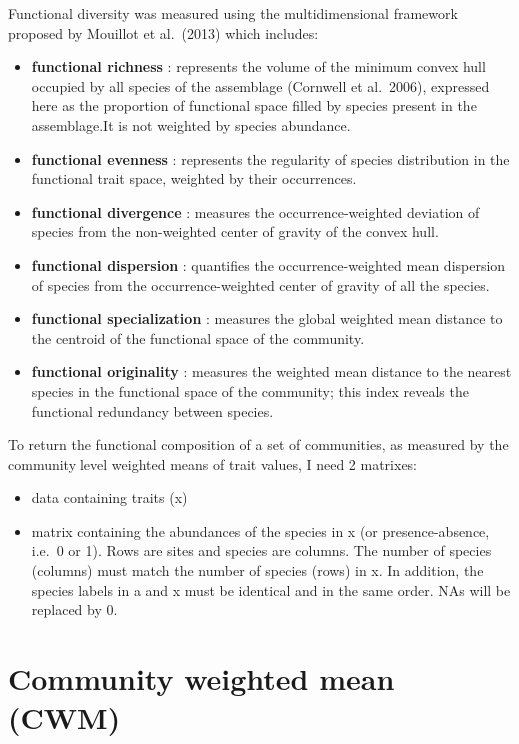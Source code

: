 \documentclass[
]{book}
\providecommand{\tightlist}{%
  \setlength{\itemsep}{0pt}\setlength{\parskip}{0pt}}
\begin{document}
Functional diversity was measured using the multidimensional framework proposed by Mouillot et al.~(2013) which includes:

\begin{itemize}
\item
  \textbf{functional richness} : represents the volume of the minimum convex hull occupied by all species of the assemblage (Cornwell et al.~2006), expressed here as the proportion of functional space filled by species present in the assemblage.It is not weighted by species abundance.
\item
  \textbf{functional evenness} : represents the regularity of species distribution in the functional trait space, weighted by their occurrences.
\item
  \textbf{functional divergence} : measures the occurrence-weighted deviation of species from the non-weighted center of gravity of the convex hull.
\item
  \textbf{functional dispersion} : quantifies the occurrence-weighted mean dispersion of species from the occurrence-weighted center of gravity of all the species.
\item
  \textbf{functional specialization} : measures the global weighted mean distance to the centroid of the functional space of the community.
\item
  \textbf{functional originality} : measures the weighted mean distance to the nearest species in the functional space of the community; this index reveals the functional redundancy between species.
\end{itemize}

To return the functional composition of a set of communities, as measured by the communitylevel weighted means of trait values, I need 2 matrixes:

\begin{itemize}
\tightlist
\item
  data containing traits (x)
\item
  matrix containing the abundances of the species in x (or presence-absence, i.e.~0 or 1). Rows are sites and species are columns. The number of species (columns) must match the number of species (rows) in x. In addition, the species labels in a and x must be identical and in the same order. NAs will be replaced by 0.
\end{itemize}

\hypertarget{community-weighted-mean-cwm}{%
\chapter{Community weighted mean (CWM)}\label{community-weighted-mean-cwm}}
\end{document}
